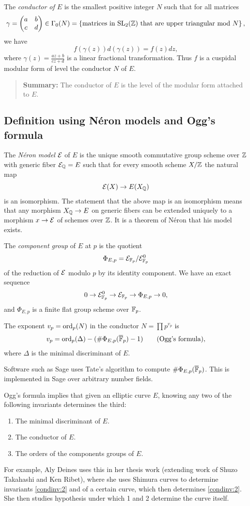 \documentclass{book}
\begin{document}
The {\em conductor of $E$} is the smallest positive integer $N$
such that for all  matrices
$$
\gamma = \left( \begin{matrix}a&b\\c&d \end{matrix}\right) \in \Gamma_0(N)
  = \left\{\text{matrices in $\operatorname{SL}_2(\mathbb{Z})$ that are upper triangular mod $N$}\right\},
$$
we have
$$f(\gamma(z))d(\gamma(z)) = f(z)dz,$$
where $\gamma(z) = \frac{az+b}{cz+d}$ is a linear fractional transformation.
Thus $f$ is a cuspidal modular form of level the conductor
$N$ of $E$.

\begin{quote}
{\bf Summary:} The conductor of $E$ is the level of the modular
form attached to $E$.
\end{quote}




\subsection{Definition using N\'eron models and Ogg's formula}

The {\em N\'eron model} $\mathcal{E}$ of $E$ is the unique
smooth commutative group scheme over $\mathbb{Z}$ with
generic fiber $\mathcal{E}_{\mathbb{Q}} = E$ such that for every smooth
scheme $X/\mathbb{Z}$ the natural map
$$
\mathcal{E}(X) \to E(X_{\mathbb{Q}})
$$
is an isomorphism.  The statement that the above
map is an isomorphism means that any morphism
$X_{\mathbb{Q}} \to E$ on generic fibers
can be extended uniquely to a morphism
$x \to \mathcal{E}$ of schemes over $\mathbb{Z}$.
It is a theorem of N\'eron that his model exists.

The {\em component group} of $E$ at $p$ is the quotient
$$
 \Phi_{E,p} = \mathcal{E}_{\mathbb{F}_p} / \mathcal{E}_{\mathbb{F}_p}^0
$$
of the reduction of $\mathcal{E}$ modulo $p$ by its identity component.
We have an exact sequence
$$
 0 \to \mathcal{E}_{\mathbb{F}_p}^0 \to \mathcal{E}_{\mathbb{F}_p} \to \Phi_{E,p} \to 0,
$$
and $\Phi_{E,p}$ is a finite flat group scheme over $\mathbb{F}_p$.

The exponent $v_p=\operatorname{ord}_p(N)$ in the conductor $N=\prod p^{v_p}$ is
$$
v_p = \operatorname{ord}_p(\Delta) - (\#\Phi_{E,p}(\overline{\mathbb{F}}_p) - 1) \qquad\text{(Ogg's formula)},
$$
where $\Delta$ is the minimal discriminant of $E$.

Software such as Sage uses Tate's algorithm to compute
$\#\Phi_{E,p}(\overline{\mathbb{F}}_p)$.  This is implemented in Sage over
arbitrary number fields.

Ogg's formula implies that given an elliptic curve $E$,
knowing any two of the following invariants determines the third:
\begin{enumerate}
\item\label{condinv:1} The minimal discriminant of $E$.
\item\label{condinv:2}  The conductor of $E$.
\item\label{condinv:3}  The orders of the components groups of $E$.
\end{enumerate}
For example, Aly Deines uses this in her thesis work (extending
work of Shuzo Takahashi and Ken Ribet),
where she uses Shimura curves to determine invariants
\ref{condinv:2} and \label{condinv:3} of a certain curve,
which then determines \ref{condinv:2}.
She then studies hypothesis under which 1 and
2 determine the curve itself.
\end{document}
